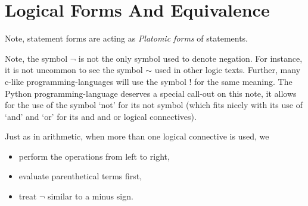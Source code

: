 



\guard

\section{Logical Forms And Equivalence}
\label{sec:logicalFormsAndEquivalence}



Note, statement forms are acting as {\it Platomic forms} of statements.



Note, the symbol $\neg$ is not the only symbol used to denote negation.
For instance, it is not uncommon to see the symbol $\sim$ used in other logic texts.
Further, many c-like programming-languages will use the symbol $!$ for the same meaning.
The Python programming-language deserves a special call-out on this note, it allows for the use of the symbol `not' for its not symbol (which fits nicely with its use of `and' and `or' for its and and or logical connectives).




Just as in arithmetic, when more than one logical connective is used, we
\begin{itemize}
  \item perform the operations from left to right,
  \item evaluate parenthetical terms first,
  \item treat $\neg$ similar to a minus sign.
\end{itemize}





















